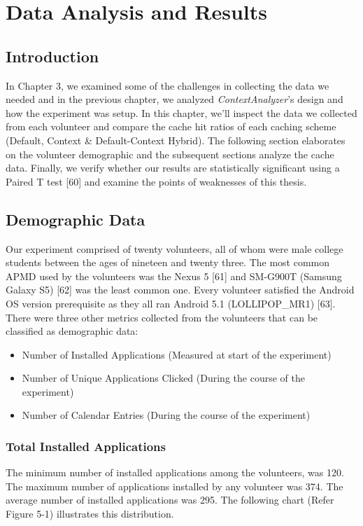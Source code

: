 \documentclass[12pt]{uthesis-v12}  %
\begin{document}
\chapter{Data Analysis and Results}

		\section{Introduction}
			In Chapter 3, we examined some of the challenges in collecting the data we needed and in the previous chapter, we analyzed {\em ContextAnalyzer}'s design and how the experiment was setup. In this chapter, we'll inspect the data we collected from each volunteer and compare the cache hit ratios of each caching scheme (Default, Context \& Default-Context Hybrid). The following section elaborates on the volunteer demographic and the subsequent sections analyze the cache data. Finally, we verify whether our results are statistically significant using a Paired T test [60] and examine the points of weaknesses of this thesis.
			
		\section{Demographic Data}
			Our experiment comprised of twenty volunteers, all of whom were male college students between the ages of nineteen and twenty three. The most common APMD used by the volunteers was the Nexus 5 [61] and SM-G900T (Samsung Galaxy S5) [62] was the least common one. Every volunteer satisfied the Android OS version prerequisite as they all ran Android 5.1 (LOLLIPOP\_MR1) [63]. There were three other metrics  collected from the volunteers that can be classified as demographic data:
			
			\begin{itemize}
				\item Number of Installed Applications (Measured at start of the experiment)
				\item Number of Unique Applications Clicked (During the course of the experiment)
				\item Number of Calendar Entries (During the course of the experiment)
			\end{itemize} 
			
			\subsection{Total Installed Applications}
				The minimum number of installed applications among the volunteers, was 120. The maximum number of applications installed by any volunteer was 374. The average number of installed applications was 295. The following chart (Refer Figure 5-1) illustrates this distribution.
				
\end{document}
